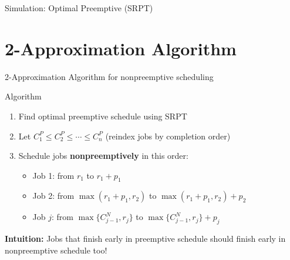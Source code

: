 \documentclass[aspectratio=169, 12pt]{beamer}
\begin{document}
\begin{frame}{Simulation: Optimal Preemptive (SRPT)}
\begin{center}
    \end{center}
    
    \vspace{0.5cm}
\end{frame}

\section{2-Approximation Algorithm}

\begin{frame}{2-Approximation Algorithm for nonpreemptive scheduling}
    \begin{block}{Algorithm}
    \begin{enumerate}
        \item Find optimal preemptive schedule using SRPT
        \item Let $C_1^P \leq C_2^P \leq \cdots \leq C_n^P$ (reindex jobs by completion order)
        \item Schedule jobs \textbf{nonpreemptively} in this order:
        \begin{itemize}
            \item Job 1: from $r_1$ to $r_1 + p_1$
            \item Job 2: from $\max(r_1+p_1, r_2)$ to $\max(r_1+p_1, r_2) + p_2$
            \item Job $j$: from $\max\{C_{j-1}^N, r_j\}$ to $\max\{C_{j-1}^N, r_j\} + p_j$
        \end{itemize}
    \end{enumerate}
    \end{block}

    \vspace{0.3cm}
    {
        \textbf{Intuition:} Jobs that finish early in preemptive schedule should finish early in nonpreemptive schedule too!
    }
\end{frame}
\end{document}
